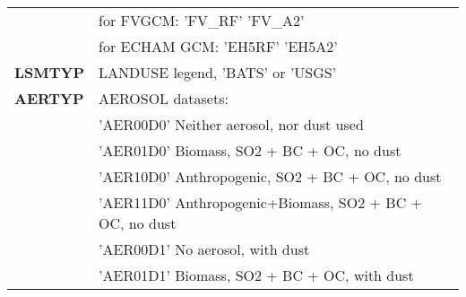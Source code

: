 \begin{table}[h]
\begin{center}
\begin{tabular}{|l|l|}
 &  \vspace{-0.15 cm} \hspace{0.5 cm} {\footnotesize for FVGCM:} \hspace{0.5 cm} {\footnotesize 'FV\_RF'}  \hspace{0.5 cm} {\footnotesize 'FV\_A2'}\\
 &  \vspace{-0.15 cm} \hspace{0.5 cm} {\footnotesize for ECHAM GCM:} \hspace{0.5 cm} {\footnotesize 'EH5RF'}  \hspace{0.5 cm} {\footnotesize 'EH5A2'}\\
\hline
{\footnotesize {\bf LSMTYP}} & {\footnotesize LANDUSE legend, 'BATS' or 'USGS'} \\ \hline
{\footnotesize {\bf AERTYP}} & {\footnotesize AEROSOL datasets:}\\
 &  \vspace{-0.15 cm} \hspace{0.5 cm} {\footnotesize 'AER00D0'} \hspace{0.5 cm} {\footnotesize Neither aerosol, nor dust used}\\
 &  \vspace{-0.15 cm} \hspace{0.5 cm} {\footnotesize 'AER01D0'} \hspace{0.5 cm} {\footnotesize Biomass, SO2 + BC + OC, no dust}\\ 
 &  \vspace{-0.15 cm} \hspace{0.5 cm} {\footnotesize 'AER10D0'} \hspace{0.5 cm} {\footnotesize Anthropogenic, SO2 + BC + OC, no dust}\\
 &  \vspace{-0.15 cm} \hspace{0.5 cm} {\footnotesize 'AER11D0'} \hspace{0.5 cm} {\footnotesize Anthropogenic+Biomass, SO2 + BC + OC, no dust}\\
 &  \vspace{-0.15 cm} \hspace{0.5 cm} {\footnotesize 'AER00D1'} \hspace{0.5 cm} {\footnotesize No aerosol, with dust}\\
&  \vspace{-0.15 cm} \hspace{0.5 cm} {\footnotesize 'AER01D1'}  \hspace{0.5 cm} {\footnotesize Biomass, SO2 + BC + OC, with dust}\\

\end{tabular}
\end{center}
\end{table}
